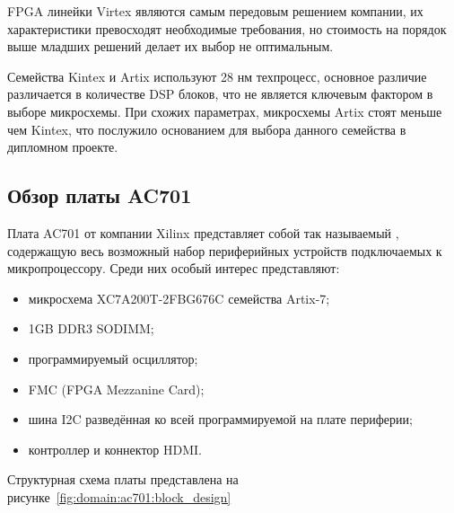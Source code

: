 FPGA линейки Virtex являются самым передовым решением компании, их характеристики превосходят необходимые требования,
но стоимость на порядок выше младших решений делает их выбор не оптимальным.

Семейства Kintex и Artix используют 28 нм техпроцесс, основное различие различается в количестве DSP блоков, что не является
ключевым фактором в выборе микросхемы. При схожих параметрах, микросхемы Artix стоят меньше чем Kintex\cite{artix_kintex_price_comparison},
что послужило основанием для выбора данного семейства в дипломном проекте.





\subsection{Обзор платы AC701}
\label{sub:domain:ac701}

Плата AC701 от компании Xilinx представляет собой так называемый ,
содержащую весь возможный набор периферийных устройств подключаемых к микропроцессору.
Среди них особый интерес представляют:
\begin{itemize}
  \item микросхема XC7A200T-2FBG676C семейства Artix-7;
  \item 1GB DDR3 SODIMM;
  \item программируемый осциллятор;
  \item FMC (FPGA Mezzanine Card);
  \item шина I2C разведённая ко всей программируемой на плате периферии;
  \item контроллер и коннектор HDMI.
\end{itemize}

Структурная схема платы представлена на рисунке~\ref{fig:domain:ac701:block_design}

